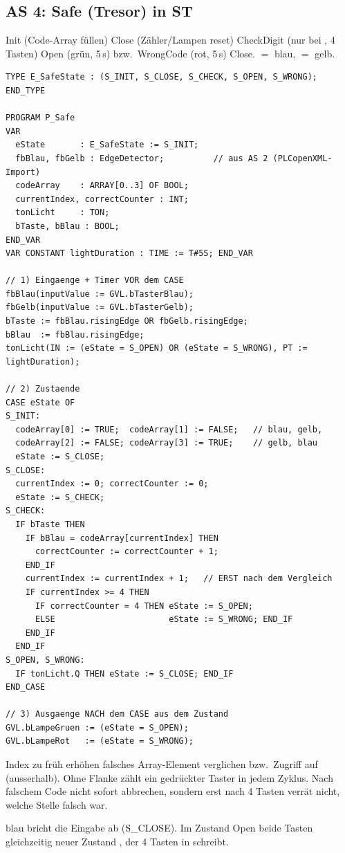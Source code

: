 \subsection{AS 4: Safe (Tresor) in ST}
\label{bsp:safe}
Init (Code-Array füllen) \ra Close (Zähler/Lampen reset) \ra CheckDigit
(nur bei , 4 Tasten) \ra Open (grün, 
5\,s) bzw.\ WrongCode (rot, 5\,s) \ra Close.  $=$ blau,
 $=$ gelb.
\begin{lstlisting}
TYPE E_SafeState : (S_INIT, S_CLOSE, S_CHECK, S_OPEN, S_WRONG); END_TYPE

PROGRAM P_Safe
VAR
  eState       : E_SafeState := S_INIT;
  fbBlau, fbGelb : EdgeDetector;          // aus AS 2 (PLCopenXML-Import)
  codeArray    : ARRAY[0..3] OF BOOL;
  currentIndex, correctCounter : INT;
  tonLicht     : TON;
  bTaste, bBlau : BOOL;
END_VAR
VAR CONSTANT lightDuration : TIME := T#5S; END_VAR

// 1) Eingaenge + Timer VOR dem CASE
fbBlau(inputValue := GVL.bTasterBlau);
fbGelb(inputValue := GVL.bTasterGelb);
bTaste := fbBlau.risingEdge OR fbGelb.risingEdge;
bBlau  := fbBlau.risingEdge;
tonLicht(IN := (eState = S_OPEN) OR (eState = S_WRONG), PT := lightDuration);

// 2) Zustaende
CASE eState OF
S_INIT:
  codeArray[0] := TRUE;  codeArray[1] := FALSE;   // blau, gelb,
  codeArray[2] := FALSE; codeArray[3] := TRUE;    // gelb, blau
  eState := S_CLOSE;
S_CLOSE:
  currentIndex := 0; correctCounter := 0;
  eState := S_CHECK;
S_CHECK:
  IF bTaste THEN
    IF bBlau = codeArray[currentIndex] THEN
      correctCounter := correctCounter + 1;
    END_IF
    currentIndex := currentIndex + 1;   // ERST nach dem Vergleich
    IF currentIndex >= 4 THEN
      IF correctCounter = 4 THEN eState := S_OPEN;
      ELSE                       eState := S_WRONG; END_IF
    END_IF
  END_IF
S_OPEN, S_WRONG:
  IF tonLicht.Q THEN eState := S_CLOSE; END_IF
END_CASE

// 3) Ausgaenge NACH dem CASE aus dem Zustand
GVL.bLampeGruen := (eState = S_OPEN);
GVL.bLampeRot   := (eState = S_WRONG);
\end{lstlisting}
\begin{falle}[Safe]
Index zu früh erhöhen \ra falsches Array-Element verglichen bzw.\
Zugriff auf  (ausserhalb). Ohne Flanke zählt ein
gedrückter Taster in jedem Zyklus. Nach falschem Code nicht sofort
abbrechen, sondern erst nach 4 Tasten \ra verrät nicht, welche Stelle
falsch war.
\end{falle}
  blau bricht die Eingabe ab (\ra S\_CLOSE). Im
Zustand Open beide Tasten gleichzeitig \ra neuer Zustand
, der 4 Tasten in  schreibt.

